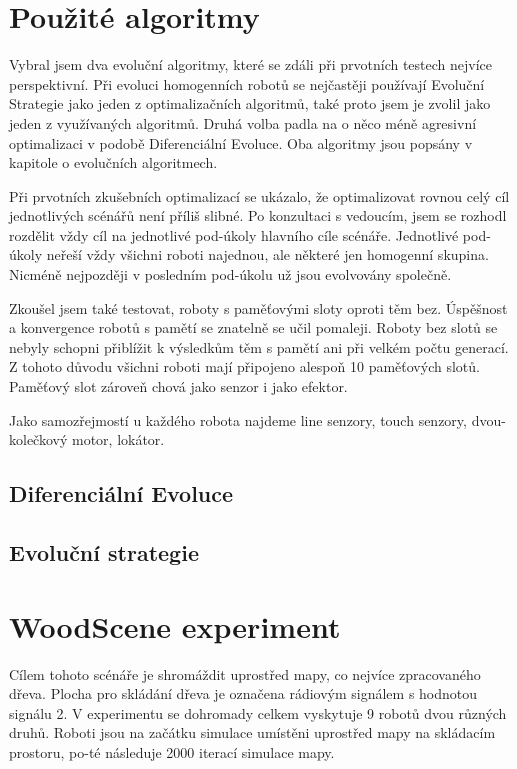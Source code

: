 \section{Použité algoritmy}
Vybral jsem dva evoluční algoritmy, které se zdáli při prvotních testech nejvíce perspektivní. Při evoluci homogenních robotů se nejčastěji používají Evoluční Strategie jako jeden z optimalizačních algoritmů, také proto jsem je zvolil jako jeden z využívaných algoritmů. Druhá volba padla na o něco méně agresivní optimalizaci v podobě Diferenciální Evoluce. Oba algoritmy jsou popsány v kapitole o evolučních algoritmech. \par 
Při prvotních zkušebních optimalizací se ukázalo, že optimalizovat rovnou celý cíl jednotlivých scénářů není příliš slibné. Po konzultaci s vedoucím, jsem se rozhodl rozdělit vždy cíl na jednotlivé pod-úkoly hlavního cíle scénáře. Jednotlivé pod-úkoly neřeší vždy všichni roboti najednou, ale některé jen homogenní skupina. Nicméně nejpozději v posledním pod-úkolu už jsou evolvovány společně.
\par
Zkoušel jsem také testovat, roboty s paměťovými sloty oproti těm bez. Úspěšnost a konvergence robotů s pamětí se znatelně se učil pomaleji. Roboty bez slotů se nebyly schopni přiblížit k výsledkům těm s pamětí ani při velkém počtu generací. Z tohoto důvodu všichni roboti mají připojeno alespoň 10 paměťových slotů. Paměťový slot zároveň chová jako senzor i jako efektor. 
\par 
Jako samozřejmostí u každého robota najdeme line senzory, touch senzory, dvou-kolečkový motor, lokátor. \par 

\subsection{Diferenciální Evoluce}

\subsection{Evoluční strategie}


\section{WoodScene experiment}
Cílem tohoto scénáře je shromáždit uprostřed mapy, co nejvíce zpracovaného dřeva. Plocha pro skládání dřeva je označena rádiovým signálem s hodnotou signálu 2. V experimentu se dohromady celkem vyskytuje 9 robotů dvou různých druhů. Roboti jsou na začátku simulace umístěni uprostřed mapy na skládacím prostoru, po-té následuje 2000 iterací simulace mapy. 

